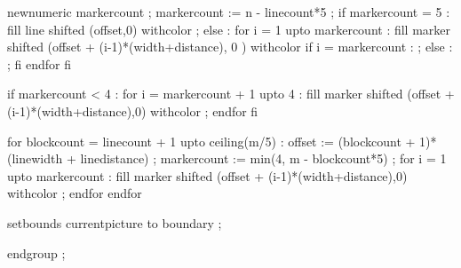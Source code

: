   newnumeric markercount ; markercount := n - linecount*5 ;
  if markercount = 5 :
      fill line shifted (offset,0)
         withcolor 
             ;
  else : for i = 1 upto markercount :
      fill marker shifted (offset + (i-1)*(width+distance), 0 ) 
         withcolor 
         if i = markercount :
             ;
         else :
             ;
         fi
  endfor fi

  if markercount < 4 :
    for i = markercount + 1 upto 4 : 
        fill marker shifted (offset + (i-1)*(width+distance),0)
        withcolor 
             ;
    endfor
  fi

  for blockcount = linecount + 1 upto ceiling(m/5) :
    offset := (blockcount + 1)*(linewidth + linedistance) ;
    markercount := min(4, m - blockcount*5) ;
    for i = 1 upto markercount :
      fill marker shifted (offset + (i-1)*(width+distance),0)
        withcolor 
             ;
    endfor
  endfor

  setbounds currentpicture to boundary ;

  endgroup ;

\stopuseMPgraphic


\protect


